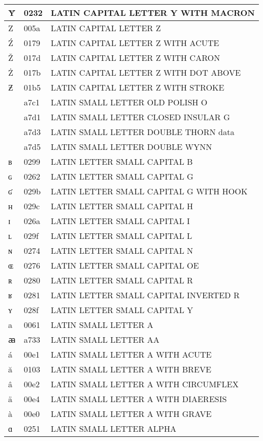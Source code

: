 \documentclass[12pt,letterpaper,openany]{book}
\begin{document}
\begin{center}
\begin{supertabular}{|m{0.25in}|m{0.5in}|m{4in}|}
Ȳ & 0232 & LATIN CAPITAL LETTER Y WITH MACRON\\\hline
Z & 005a & LATIN CAPITAL LETTER Z\\\hline
Ź & 0179 & LATIN CAPITAL LETTER Z WITH ACUTE\\\hline
Ž & 017d & LATIN CAPITAL LETTER Z WITH CARON\\\hline
Ż & 017b & LATIN CAPITAL LETTER Z WITH DOT ABOVE\\\hline
Ƶ & 01b5 & LATIN CAPITAL LETTER Z WITH STROKE\\\hline
ꟁ & a7c1 & LATIN SMALL LETTER OLD POLISH O\\\hline
ꟑ & a7d1 & LATIN SMALL LETTER CLOSED INSULAR G\\\hline
ꟓ & a7d3 & LATIN SMALL LETTER DOUBLE THORN data\\\hline
ꟕ & a7d5 & LATIN SMALL LETTER DOUBLE WYNN\\\hline
ʙ & 0299 & LATIN LETTER SMALL CAPITAL B\\\hline
ɢ & 0262 & LATIN LETTER SMALL CAPITAL G\\\hline
ʛ & 029b & LATIN LETTER SMALL CAPITAL G WITH HOOK\\\hline
ʜ & 029c & LATIN LETTER SMALL CAPITAL H\\\hline
ɪ & 026a & LATIN LETTER SMALL CAPITAL I\\\hline
ʟ & 029f & LATIN LETTER SMALL CAPITAL L\\\hline
ɴ & 0274 & LATIN LETTER SMALL CAPITAL N\\\hline
ɶ & 0276 & LATIN LETTER SMALL CAPITAL OE\\\hline
ʀ & 0280 & LATIN LETTER SMALL CAPITAL R\\\hline
ʁ & 0281 & LATIN LETTER SMALL CAPITAL INVERTED R\\\hline
ʏ & 028f & LATIN LETTER SMALL CAPITAL Y\\\hline
a & 0061 & LATIN SMALL LETTER A\\\hline
ꜳ & a733 & LATIN SMALL LETTER AA\\\hline
á & 00e1 & LATIN SMALL LETTER A WITH ACUTE\\\hline
ă & 0103 & LATIN SMALL LETTER A WITH BREVE\\\hline
â & 00e2 & LATIN SMALL LETTER A WITH CIRCUMFLEX\\\hline
ä & 00e4 & LATIN SMALL LETTER A WITH DIAERESIS\\\hline
à & 00e0 & LATIN SMALL LETTER A WITH GRAVE\\\hline
ɑ & 0251 & LATIN SMALL LETTER ALPHA\\\hline

\end{supertabular}
\end{center}
\end{document}
